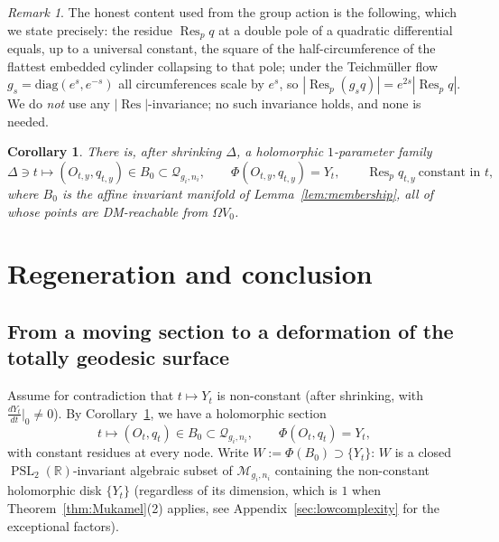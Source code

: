 \documentclass[11pt]{article}
\newcommand{\R}{\mathbb{R}}
\newcommand{\cQ}{\mathcal{Q}}
\newcommand{\M}{\mathcal{M}}
\DeclareMathOperator{\PSL}{PSL}
\DeclareMathOperator{\Res}{Res}
\newtheorem{cor}[thm]{Corollary}
\theoremstyle{definition}
\theoremstyle{remark}
\newtheorem{rmk}[thm]{Remark}
\begin{document}
\begin{rmk}
The honest content used from the group action is the following, which we
state precisely: the residue $\Res_p q$ at a double pole of a quadratic
differential equals, up to a universal constant, the square of the
half-circumference of the flattest embedded cylinder collapsing to that
pole; under the Teichm\"uller flow
$g_s = \mathrm{diag}(e^{s}, e^{-s})$ all circumferences scale by $e^{s}$,
so $|\Res_p (g_s q)| = e^{2s} |\Res_p q|$. We do \emph{not} use any
$|\Res|$-invariance; no such invariance holds, and none is needed.
\end{rmk}

\begin{cor}\label{cor:section}
There is, after shrinking $\Delta$, a holomorphic $1$-parameter family
\[
\Delta \ni t \longmapsto (O_{t,y},q_{t,y}) \in B_0 \subset
\cQ_{g_i,n_i}, \qquad \Phi(O_{t,y},q_{t,y}) = Y_t,
\qquad \Res_p q_{t,y} \ \text{constant in } t,
\]
where $B_0$ is the affine invariant manifold of
Lemma~\ref{lem:membership}, all of whose points are DM-reachable from
$\Omega V_0$.
\end{cor}
\section{Regeneration and conclusion}
\label{sec:conclusion}

\subsection{From a moving section to a deformation of the totally geodesic
surface}

Assume for contradiction that $t \mapsto Y_t$ is non-constant
(after shrinking, with $\frac{dY_t}{dt}\big|_{0} \neq 0$). By
Corollary~\ref{cor:section}, we have a holomorphic section
\[
t \longmapsto (O_t, q_t) \in B_0 \subset \cQ_{g_i,n_i}, \qquad
\Phi(O_t, q_t) = Y_t,
\]
with constant residues at every node. Write $W := \Phi(B_0) \supset
\{Y_t\}$: $W$ is a closed $\PSL_2(\R)$-invariant algebraic subset of
$\M_{g_i,n_i}$ containing the non-constant holomorphic disk
$\{Y_t\}$ (regardless of its dimension, which is $1$ when
Theorem~\ref{thm:Mukamel}(2) applies, see Appendix~\ref{sec:lowcomplexity}
for the exceptional factors).
\end{document}
